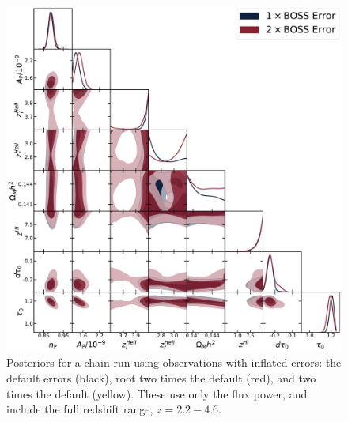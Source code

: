 \documentclass[a4paper,11pt]{article}
\begin{document}
\begin{figure}
    \centering
    \includegraphics[width=\textwidth]{figures/2xboss.pdf}
    \caption{\label{fig:2xboss_corner}
    Posteriors for a chain run using observations with inflated errors: the default errors (black), root two times the default (red), and two times the default (yellow).
    These use only the flux power, and include the full redshift range, $z=2.2-4.6$.
    }
\end{figure}





\end{document}

